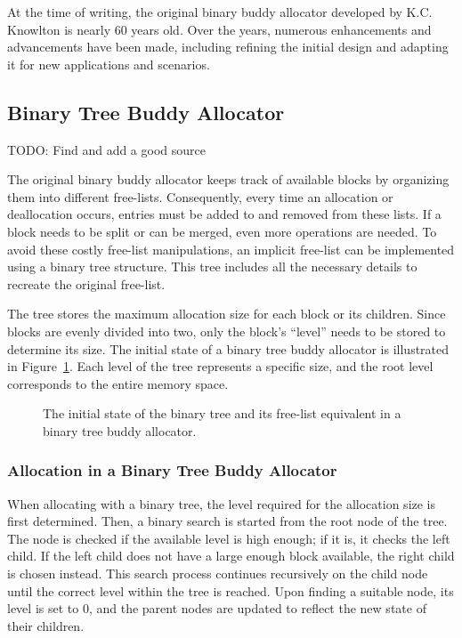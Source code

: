 At the time of writing, the original binary buddy allocator developed by K.C. Knowlton is nearly 60 years old. Over the years, numerous enhancements and advancements have been made, including refining the initial design and adapting it for new applications and scenarios.

\subsection{Binary Tree Buddy Allocator}
TODO: Find and add a good source

The original binary buddy allocator keeps track of available blocks by organizing them into different free-lists. Consequently, every time an allocation or deallocation occurs, entries must be added to and removed from these lists. If a block needs to be split or can be merged, even more operations are needed. To avoid these costly free-list manipulations, an implicit free-list can be implemented using a binary tree structure. This tree includes all the necessary details to recreate the original free-list.

The tree stores the maximum allocation size for each block or its children. Since blocks are evenly divided into two, only the block's ``level'' needs to be stored to determine its size. The initial state of a binary tree buddy allocator is illustrated in Figure~\ref{fig:btbuddyinitial}. Each level of the tree represents a specific size, and the root level corresponds to the entire memory space.

\begin{figure}[H]
    \centering
    
    \caption{The initial state of the binary tree and its free-list equivalent in a binary tree buddy allocator.}
    \label{fig:btbuddyinitial}
\end{figure}

\subsubsection{Allocation in a Binary Tree Buddy Allocator}
When allocating with a binary tree, the level required for the allocation size is first determined. Then, a binary search is started from the root node of the tree. The node is checked if the available level is high enough; if it is, it checks the left child. If the left child does not have a large enough block available, the right child is chosen instead. This search process continues recursively on the child node until the correct level within the tree is reached. Upon finding a suitable node, its level is set to 0, and the parent nodes are updated to reflect the new state of their children.

